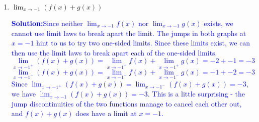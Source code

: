 \documentclass[letterpaper,11pt]{article}
\def\ds{\displaystyle}
\newcommand{\sol}[2]{\begin{minipage}[c][#1]{\linewidth}{\textcolor{blue}{\textbf{Solution:}}\quad\textcolor{blue}{#2}}\end{minipage}}
\newcommand{\sol}[2]{\begin{minipage}[c][#1]{\linewidth}{\vfill}\end{minipage}}
\begin{document}
\begin{enumerate}
\sol{.7in}{$\ds \lim_{x\rightarrow 1} \sqrt{1+f(x)+g(x)} = \sqrt {\lim_{x\rightarrow 1} (1+f(x)+g(x))} = \sqrt{1+ \lim_{x\rightarrow 1}f(x) + \lim_{x\rightarrow 1} g(x)} = {\sqrt{1 + 2+1}=2}$}

\item $\ds \lim_{x\rightarrow -1} (f(x)+g(x))$

\sol{2in}{Since neither $\ds\lim_{x\rightarrow -1} f(x)$ nor $\ds \lim_{x\rightarrow -1} g(x)$ exists, we cannot use limit laws to break apart the limit.  The jumps in both graphs at $x=-1$ hint to us to try two one-sided limits. Since these limits exist, we can then use the limit laws to break apart each of the one-sided limits.
$$\lim_{x\rightarrow-1^+} (f(x)+g(x)) = \lim_{x\rightarrow-1^+} f(x)+ \lim_{x\rightarrow-1^+} g(x) = -2+-1 = -3$$
$$\lim_{x\rightarrow-1^-} (f(x)+g(x)) = \lim_{x\rightarrow-1^-} f(x)+ \lim_{x\rightarrow-1^-} g(x) = -1+-2 = -3$$
Since $\ds\lim_{x\rightarrow-1^+} (f(x)+g(x)) = \lim_{x\rightarrow-1^-} (f(x)+g(x)) = -3$, we have $\ds\lim_{x\rightarrow -1} (f(x)+g(x)) = -3$.  This is a little surprising - the jump discontinuities of the two functions manage to cancel each other out, and $f(x)+g(x)$ does have a limit at $x=-1$.}


\end{enumerate}
\end{document}
